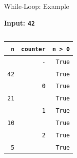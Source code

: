 \begin{frame}{While-Loop: Example}

    \begin{exampleblock}{}
        \textbf{Input: \texttt{42}}
    \end{exampleblock}
    \vspace{-1em}

    \begin{columns}[totalwidth=\textwidth, t]

    \begin{column}{0.5\textwidth}

        \begin{center}

        \begin{tabular}{r r r}
            \textbf{\texttt{n}} & \textbf{\texttt{counter}} & \textbf{\texttt{n > 0}} \\
            \hline \hline
            \texttt{\color{red}{42}} & \texttt{-} & \texttt{True} \\
            \texttt{42} & \texttt{\color{red}{0}} & \texttt{True} \\
            \hline \hline
            \texttt{\color{red}{21}} & \texttt{0} & \texttt{True} \\
            \texttt{21} & \texttt{\color{red}{1}} & \texttt{True} \\
            \hline
            \texttt{\color{red}{10}} & \texttt{1} & \texttt{True} \\
            \texttt{10} & \texttt{\color{red}{2}} & \texttt{True} \\
            \hline
            \texttt{\color{red}{5}} & \texttt{2} & \texttt{True} \\
            \texttt{5} & \texttt{\color{red}{3}} & \texttt{True} \\
        \end{tabular}

        \end{center}

    \end{column}

    \begin{column}{0.5\textwidth}

        \begin{center}


\end{center}
\end{column}
\end{columns}
\end{frame}
